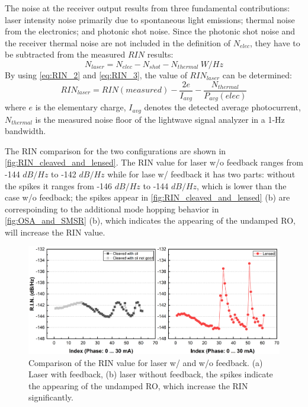 The noise at the receiver output results from three fundamental contributions: laser intensity noise primarily due to spontaneous light emissions; thermal noise from the electronics; and photonic shot noise. Since the photonic shot noise and the receiver thermal noise are not included in the definition of $N_{elec}$, they have to be subtracted from the measured $RIN$ results:
\begin{equation}
    N_{laser}=N_{elec}-N_{shot}-N_{thermal} \ W/Hz
    \label{eq:RIN_3}
\end{equation}
By using \autoref{eq:RIN_2} and \autoref{eq:RIN_3}, the value of $RIN_{laser}$ can be determined:
\begin{equation}
    RIN_{laser}=RIN(measured)-\frac{2e}{I_{avg}}-\frac{N_{thermal}}{P_{avg}(elec)}
    \label{eq:RIN_4}
\end{equation}
where $e$ is the elementary charge, $I_{avg}$ denotes the detected average photocurrent, $N_{thermal}$ is the measured noise floor of the lightwave signal analyzer in a 1-Hz bandwidth.

The RIN comparison for the two configurations are shown in \autoref{fig:RIN_cleaved_and_lensed}. The RIN value for laser w/o feedback ranges from -144 $dB/Hz$ to -142 $dB/Hz$ while for lase w/ feedback it has two parts: without the spikes it ranges from -146 $dB/Hz$ to -144 $dB/Hz$, which is lower than the case w/o feedback; the spikes appear in \autoref{fig:RIN_cleaved_and_lensed} (b) are correspoinding to the additional mode hopping behavior in \autoref{fig:OSA_and_SMSR} (b), which indicates the appearing of the undamped RO, will increase the RIN value.

\begin{figure}[ht]
    \centering
    \includegraphics[width=\linewidth]{figures/RIN_cleaved_and_lensed.png}
    \caption{Comparison of the RIN value for laser w/ and w/o feedback. (a) Laser with feedback, (b) laser without feedback, the spikes indicate the appearing of the undamped RO, which increase the RIN significantly.}
    \label{fig:RIN_cleaved_and_lensed}
\end{figure}

